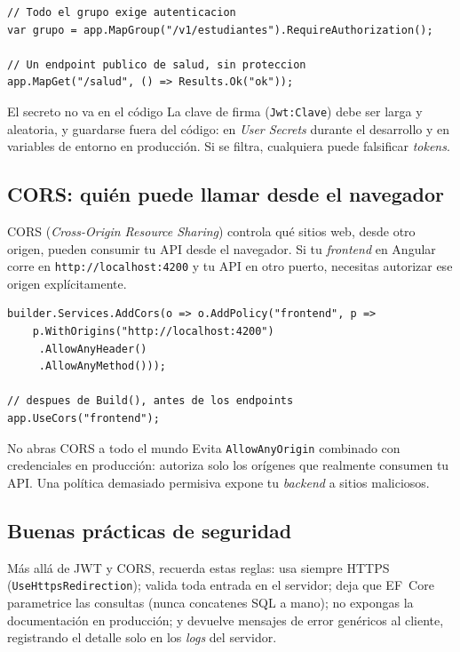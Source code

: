 \documentclass[11pt]{article}
\begin{document}
\begin{cajacodigo}
\begin{lstlisting}[style=cs]
// Todo el grupo exige autenticacion
var grupo = app.MapGroup("/v1/estudiantes").RequireAuthorization();

// Un endpoint publico de salud, sin proteccion
app.MapGet("/salud", () => Results.Ok("ok"));
\end{lstlisting}
\end{cajacodigo}
\vspace{2pt}
\begin{cajawarn}{El secreto no va en el código}
La clave de firma (\texttt{Jwt:Clave}) debe ser larga y aleatoria, y guardarse fuera del código: en \emph{User Secrets} durante el desarrollo y en variables de entorno en producción. Si se filtra, cualquiera puede falsificar \emph{tokens}.\par
\end{cajawarn}

\subsection{CORS: quién puede llamar desde el navegador}
CORS (\emph{Cross-Origin Resource Sharing}) controla qué sitios web, desde otro origen, pueden consumir tu API desde el navegador. Si tu \emph{frontend} en Angular corre en \texttt{http://localhost:4200} y tu API en otro puerto, necesitas autorizar ese origen explícitamente.

\begin{cajacodigo}
\begin{lstlisting}[style=cs]
builder.Services.AddCors(o => o.AddPolicy("frontend", p =>
    p.WithOrigins("http://localhost:4200")
     .AllowAnyHeader()
     .AllowAnyMethod()));

// despues de Build(), antes de los endpoints
app.UseCors("frontend");
\end{lstlisting}
\end{cajacodigo}
\vspace{2pt}
\begin{cajadanger}{No abras CORS a todo el mundo}
Evita \texttt{AllowAnyOrigin} combinado con credenciales en producción: autoriza solo los orígenes que realmente consumen tu API. Una política demasiado permisiva expone tu \emph{backend} a sitios maliciosos.\par
\end{cajadanger}

\subsection{Buenas prácticas de seguridad}
Más allá de JWT y CORS, recuerda estas reglas: usa siempre HTTPS (\texttt{UseHttpsRedirection}); valida toda entrada en el servidor; deja que EF~Core parametrice las consultas (nunca concatenes SQL a mano); no expongas la documentación en producción; y devuelve mensajes de error genéricos al cliente, registrando el detalle solo en los \emph{logs} del servidor.
\end{document}
